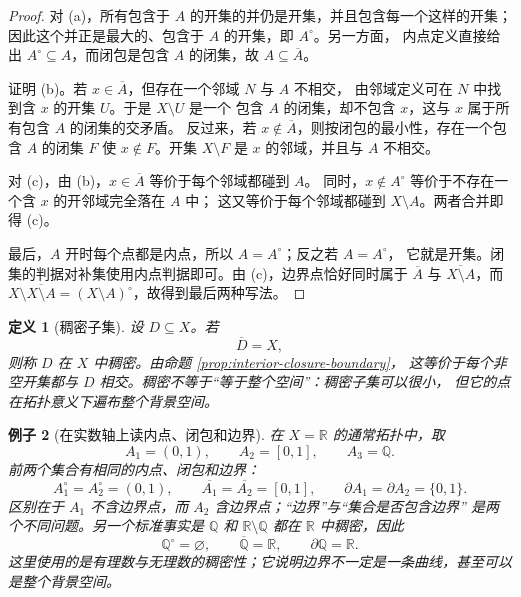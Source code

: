 \documentclass[UTF8,fontset=none,a4paper,11pt]{ctexart}
\theoremstyle{foundation-definition}
\newtheorem{definition}{定义}[section]
\theoremstyle{foundation-theorem}
\theoremstyle{foundation-proposition}
\theoremstyle{foundation-example}
\newtheorem{example}[definition]{例子}
\theoremstyle{foundation-remark}
\theoremstyle{foundation-theorem}
\begin{document}
\begin{proof}
对 (a)，所有包含于 \(A\) 的开集的并仍是开集，并且包含每一个这样的开集；
因此这个并正是最大的、包含于 \(A\) 的开集，即 \(A^\circ\)。另一方面，
内点定义直接给出 \(A^\circ\subseteq A\)，而闭包是包含 \(A\) 的闭集，故
\(A\subseteq\overline A\)。

证明 (b)。若 \(x\in\overline A\)，但存在一个邻域 \(N\) 与 \(A\) 不相交，
由邻域定义可在 \(N\) 中找到含 \(x\) 的开集 \(U\)。于是 \(X\setminus U\) 是一个
包含 \(A\) 的闭集，却不包含 \(x\)，这与 \(x\) 属于所有包含 \(A\) 的闭集的交矛盾。
反过来，若 \(x\notin\overline A\)，则按闭包的最小性，存在一个包含 \(A\) 的闭集
\(F\) 使 \(x\notin F\)。开集 \(X\setminus F\) 是 \(x\) 的邻域，并且与 \(A\) 不相交。

对 (c)，由 (b)，\(x\in\overline A\) 等价于每个邻域都碰到 \(A\)。
同时，\(x\notin A^\circ\) 等价于不存在一个含 \(x\) 的开邻域完全落在 \(A\) 中；
这又等价于每个邻域都碰到 \(X\setminus A\)。两者合并即得 (c)。

最后，\(A\) 开时每个点都是内点，所以 \(A=A^\circ\)；反之若 \(A=A^\circ\)，
它就是开集。闭集的判据对补集使用内点判据即可。由 (c)，边界点恰好同时属于
\(\overline A\) 与 \(\overline{X\setminus A}\)，而
\(X\setminus\overline{X\setminus A}=(X\setminus A)^\circ\)，故得到最后两种写法。
\end{proof}

\begin{definition}[稠密子集]\label{def:dense-subset}
设 \(D\subseteq X\)。若
\[
\overline D=X,
\]
则称 \(D\) 在 \(X\) 中稠密。由命题 \ref{prop:interior-closure-boundary}，
这等价于每个非空开集都与 \(D\) 相交。稠密不等于“等于整个空间”：稠密子集可以很小，
但它的点在拓扑意义下遍布整个背景空间。
\end{definition}

\begin{example}[在实数轴上读内点、闭包和边界]\label{ex:interior-closure-boundary}
在 \(X=\mathbb R\) 的通常拓扑中，取
\[
A_1=(0,1),\qquad A_2=[0,1],\qquad A_3=\mathbb Q.
\]
前两个集合有相同的内点、闭包和边界：
\[
A_1^\circ=A_2^\circ=(0,1),\qquad
\overline{A_1}=\overline{A_2}=[0,1],\qquad
\partial A_1=\partial A_2=\{0,1\}.
\]
区别在于 \(A_1\) 不含边界点，而 \(A_2\) 含边界点；“边界”与“集合是否包含边界”
是两个不同问题。另一个标准事实是 \(\mathbb Q\) 和 \(\mathbb R\setminus\mathbb Q\)
都在 \(\mathbb R\) 中稠密，因此
\[
\mathbb Q^\circ=\varnothing,\qquad
\overline{\mathbb Q}=\mathbb R,\qquad
\partial\mathbb Q=\mathbb R.
\]
这里使用的是有理数与无理数的稠密性；它说明边界不一定是一条曲线，甚至可以是整个背景空间。
\end{example}
\end{document}
